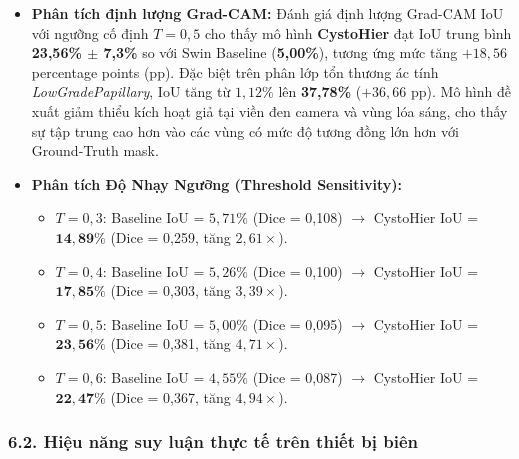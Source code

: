 \documentclass[
  11pt,
  a4paper,
]{article}
\providecommand{\tightlist}{%
  \setlength{\itemsep}{0pt}\setlength{\parskip}{0pt}}
\begin{document}
\begin{itemize}
\tightlist
\item
  \textbf{Phân tích định lượng Grad-CAM:} Đánh giá định lượng Grad-CAM
  IoU với ngưỡng cố định \(T=0{,}5\) cho thấy mô hình \textbf{CystoHier}
  đạt IoU trung bình \textbf{23,56\% \(\pm\) 7,3\%} so với Swin Baseline
  (\textbf{5,00\%}), tương ứng mức tăng \(+18{,}56\) percentage points
  (pp). Đặc biệt trên phân lớp tổn thương ác tính
  \emph{LowGradePapillary}, IoU tăng từ \(1{,}12\%\) lên
  \textbf{37,78\%} (\(+36{,}66\) pp). Mô hình đề xuất giảm thiểu kích
  hoạt giả tại viền đen camera và vùng lóa sáng, cho thấy sự tập trung
  cao hơn vào các vùng có mức độ tương đồng lớn hơn với Ground-Truth
  mask.
\item
  \textbf{Phân tích Độ Nhạy Ngưỡng (Threshold Sensitivity):}

  \begin{itemize}
  \tightlist
  \item
    \(T=0{,}3\): Baseline IoU = \(5{,}71\%\) (Dice = 0,108) \(\to\)
    CystoHier IoU = \(\mathbf{14{,}89\%}\) (Dice = 0,259, tăng
    \(2{,}61\times\)).
  \item
    \(T=0{,}4\): Baseline IoU = \(5{,}26\%\) (Dice = 0,100) \(\to\)
    CystoHier IoU = \(\mathbf{17{,}85\%}\) (Dice = 0,303, tăng
    \(3{,}39\times\)).
  \item
    \(T=0{,}5\): Baseline IoU = \(5{,}00\%\) (Dice = 0,095) \(\to\)
    CystoHier IoU = \(\mathbf{23{,}56\%}\) (Dice = 0,381, tăng
    \(4{,}71\times\)).
  \item
    \(T=0{,}6\): Baseline IoU = \(4{,}55\%\) (Dice = 0,087) \(\to\)
    CystoHier IoU = \(\mathbf{22{,}47\%}\) (Dice = 0,367, tăng
    \(4{,}94\times\)).
  \end{itemize}
\end{itemize}

\subsubsection{6.2. Hiệu năng suy luận thực tế trên thiết bị
biên}\label{hiux1ec7u-nux103ng-suy-luux1eadn-thux1ef1c-tux1ebf-truxean-thiux1ebft-bux1ecb-biuxean}
\end{document}
